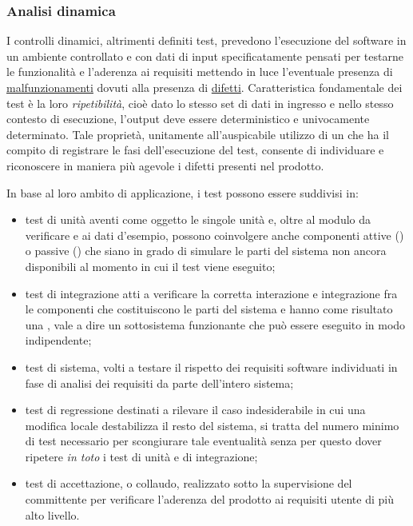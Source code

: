{\subsubsection{Analisi dinamica}
I controlli dinamici, altrimenti definiti test, prevedono l'esecuzione del software in un ambiente controllato e con dati di input specificatamente pensati per testarne le funzionalità e l'aderenza ai requisiti mettendo in luce l'eventuale presenza di \underline{malfunzionamenti} dovuti alla presenza di \underline{difetti}. Caratteristica fondamentale dei test è la loro \emph{ripetibilità}, cioè dato lo stesso set di dati in ingresso e nello stesso contesto di esecuzione, l'output deve essere deterministico e univocamente determinato. Tale proprietà, unitamente all'auspicabile utilizzo di un  che ha il compito di registrare le fasi dell'esecuzione del test, consente di individuare e riconoscere in maniera più agevole i difetti presenti nel prodotto.

In base al loro ambito di applicazione, i test possono essere suddivisi in:
\begin{itemize}
  \item test di unità aventi come oggetto le singole unità e, oltre al modulo da verificare e ai dati d'esempio, possono coinvolgere anche componenti attive () o passive () che siano in grado di simulare le parti del sistema non ancora disponibili al momento in cui il test viene eseguito;
  \item test di integrazione atti a verificare la corretta interazione e integrazione fra le componenti che costituiscono le parti del sistema e hanno come risultato una , vale a dire un sottosistema funzionante che può essere eseguito in modo indipendente;
  \item test di sistema, volti a testare il rispetto dei requisiti software individuati in fase di analisi dei requisiti da parte dell'intero sistema; 
  \item test di regressione destinati a rilevare il caso indesiderabile in cui una modifica locale destabilizza il resto del sistema, si tratta del numero minimo di test necessario per scongiurare tale eventualità senza per questo dover ripetere \emph{in toto} i test di unità e di integrazione;
  \item test di accettazione, o collaudo, realizzato sotto la supervisione del committente per verificare l'aderenza del prodotto ai requisiti utente di più alto livello.
\end{itemize}

}

